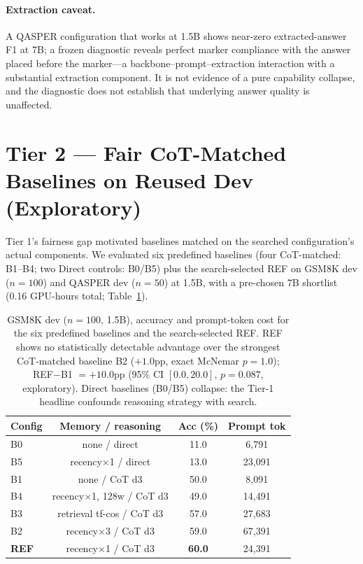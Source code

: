 \documentclass[11pt]{article}
\begin{document}
\paragraph{Extraction caveat.} A QASPER configuration that works at 1.5B
shows near-zero extracted-answer F1 at 7B; a frozen diagnostic reveals
perfect marker compliance with the answer placed before the marker---a
backbone--prompt--extraction interaction with a substantial extraction
component. It is not evidence of a pure capability collapse, and the
diagnostic does not establish that underlying answer quality is unaffected.

\section{Tier 2 --- Fair CoT-Matched Baselines on Reused Dev (Exploratory)}
\label{sec:tier2}

Tier 1's fairness gap motivated baselines matched on the searched
configuration's actual components. We evaluated six predefined baselines
(four CoT-matched: B1--B4; two Direct controls: B0/B5) plus the
search-selected REF on GSM8K dev ($n{=}100$) and QASPER dev ($n{=}50$) at
1.5B, with a pre-chosen 7B shortlist (0.16 GPU-hours total;
Table~\ref{tab:f1}).

\begin{table}[t]
\centering\small
\begin{tabular}{@{}lccc@{}}
\toprule
Config & Memory / reasoning & Acc (\%) & Prompt tok \\
\midrule
B0 & none / direct & 11.0 & 6{,}791 \\
B5 & recency$\times$1 / direct & 13.0 & 23{,}091 \\
B1 & none / CoT d3 & 50.0 & 8{,}091 \\
B4 & recency$\times$1, 128w / CoT d3 & 49.0 & 14{,}491 \\
B3 & retrieval tf-cos / CoT d3 & 57.0 & 27{,}683 \\
B2 & recency$\times$3 / CoT d3 & 59.0 & 67{,}391 \\
\textbf{REF} & recency$\times$1 / CoT d3 & \textbf{60.0} & 24{,}391 \\
\bottomrule
\end{tabular}
\caption{GSM8K dev ($n{=}100$, 1.5B), accuracy and prompt-token cost for
the six predefined baselines and the search-selected REF. REF shows no
statistically detectable advantage over the strongest CoT-matched baseline
B2 ($+1.0$pp, exact McNemar $p{=}1.0$); REF$-$B1 $= +10.0$pp (95\% CI
$[0.0, 20.0]$, $p{=}0.087$, exploratory). Direct baselines (B0/B5)
collapse: the Tier-1 headline confounds reasoning strategy with search.}
\label{tab:f1}
\end{table}
\end{document}

